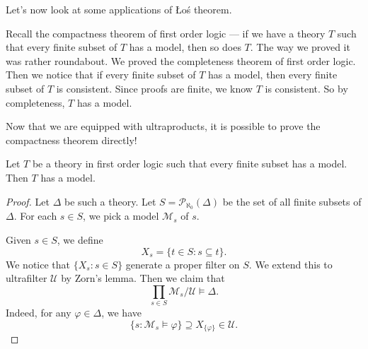 \documentclass[a4paper]{article}
\begin{document}


%
Let's now look at some applications of \L{}o\'s theorem.

Recall the compactness theorem of first order logic --- if we have a theory $T$ such that every finite subset of $T$ has a model, then so does $T$. The way we proved it was rather roundabout. We proved the completeness theorem of first order logic. Then we notice that if every finite subset of $T$ has a model, then every finite subset of $T$ is consistent. Since proofs are finite, we know $T$ is consistent. So by completeness, $T$ has a model.

Now that we are equipped with ultraproducts, it is possible to prove the compactness theorem directly!
\begin{thm}
  Let $T$ be a theory in first order logic such that every finite subset has a model. Then $T$ has a model.
\end{thm}

\begin{proof}
  Let $\Delta$ be such a theory. Let $S = \mathcal{P}_{\aleph_0}(\Delta)$ be the set of all finite subsets of $\Delta$. For each $s \in S$, we pick a model $\mathcal{M}_s$ of $s$.

  Given $s \in S$, we define
  \[
    X_s = \{t \in S: s \subseteq t\}.
  \]
  We notice that $\{X_s: s \in S\}$ generate a proper filter on $S$. We extend this to ultrafilter $\mathcal{U}$ by Zorn's lemma. Then we claim that
  \[
    \prod_{s \in S} \mathcal{M}_s/\mathcal{U}\vDash \Delta.
  \]
  Indeed, for any $\varphi \in \Delta$, we have
  \[
    \{s: \mathcal{M}_s \vDash \varphi\} \supseteq X_{\{\varphi\}} \in \mathcal{U}.
  \]
\end{proof}
\end{document}
